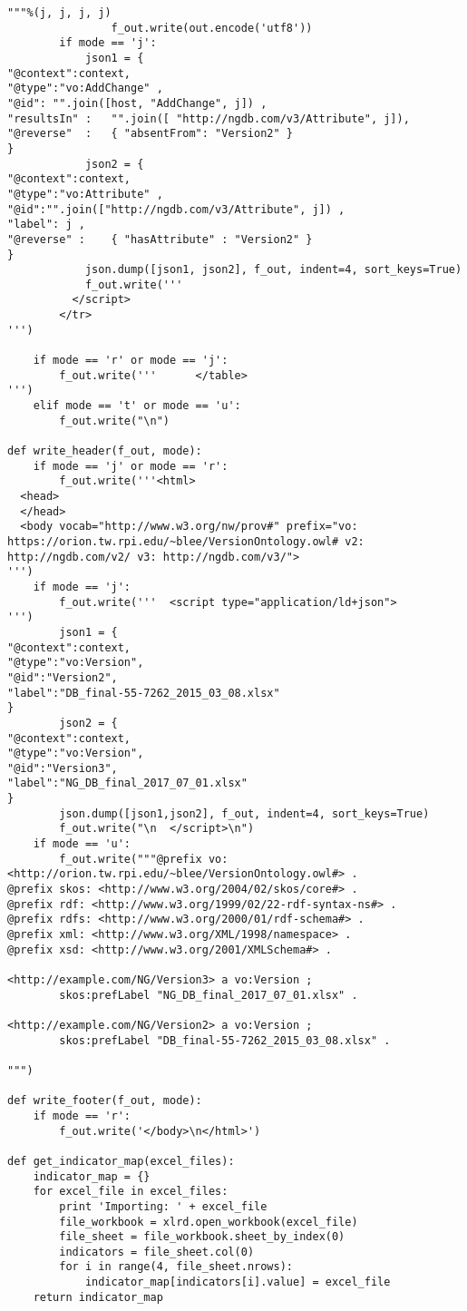 \begin{verbatim}
"""%(j, j, j, j)
                f_out.write(out.encode('utf8'))
		if mode == 'j':
			json1 = {
"@context":context,
"@type":"vo:AddChange" ,
"@id": "".join([host, "AddChange", j]) ,
"resultsIn" :   "".join([ "http://ngdb.com/v3/Attribute", j]),
"@reverse"  :   { "absentFrom": "Version2" }
}
			json2 = {
"@context":context,
"@type":"vo:Attribute" ,
"@id":"".join(["http://ngdb.com/v3/Attribute", j]) ,
"label": j ,
"@reverse" :    { "hasAttribute" : "Version2" }
}
			json.dump([json1, json2], f_out, indent=4, sort_keys=True)
			f_out.write('''
          </script>
        </tr>
''')

	if mode == 'r' or mode == 'j':
		f_out.write('''      </table>
''')
	elif mode == 't' or mode == 'u':
		f_out.write("\n")
	
def write_header(f_out, mode):
	if mode == 'j' or mode == 'r':
		f_out.write('''<html>
  <head>
  </head>
  <body vocab="http://www.w3.org/nw/prov#" prefix="vo: https://orion.tw.rpi.edu/~blee/VersionOntology.owl# v2: http://ngdb.com/v2/ v3: http://ngdb.com/v3/">
''')
	if mode == 'j':
		f_out.write('''  <script type="application/ld+json">
''')
		json1 = {
"@context":context,
"@type":"vo:Version",
"@id":"Version2",
"label":"DB_final-55-7262_2015_03_08.xlsx"
}
		json2 = {
"@context":context,
"@type":"vo:Version",
"@id":"Version3",
"label":"NG_DB_final_2017_07_01.xlsx"
}
		json.dump([json1,json2], f_out, indent=4, sort_keys=True)
		f_out.write("\n  </script>\n")
	if mode == 'u':
		f_out.write("""@prefix vo: <http://orion.tw.rpi.edu/~blee/VersionOntology.owl#> .
@prefix skos: <http://www.w3.org/2004/02/skos/core#> .
@prefix rdf: <http://www.w3.org/1999/02/22-rdf-syntax-ns#> .
@prefix rdfs: <http://www.w3.org/2000/01/rdf-schema#> .
@prefix xml: <http://www.w3.org/XML/1998/namespace> .
@prefix xsd: <http://www.w3.org/2001/XMLSchema#> .

<http://example.com/NG/Version3> a vo:Version ;
        skos:prefLabel "NG_DB_final_2017_07_01.xlsx" .

<http://example.com/NG/Version2> a vo:Version ;
        skos:prefLabel "DB_final-55-7262_2015_03_08.xlsx" .

""")

def write_footer(f_out, mode):
	if mode == 'r':
		f_out.write('</body>\n</html>')

def get_indicator_map(excel_files):
	indicator_map = {}
	for excel_file in excel_files:
		print 'Importing: ' + excel_file
		file_workbook = xlrd.open_workbook(excel_file)
		file_sheet = file_workbook.sheet_by_index(0)
		indicators = file_sheet.col(0)
		for i in range(4, file_sheet.nrows):
			indicator_map[indicators[i].value] = excel_file
	return indicator_map


\end{verbatim}
